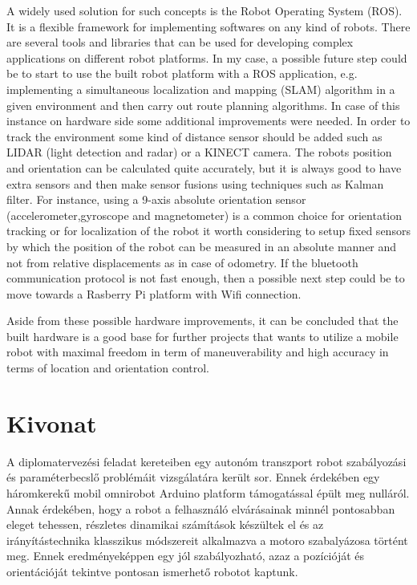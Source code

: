 \documentclass[12pt,english,twoside]{article}
\begin{document}
A widely used solution for such concepts is the Robot Operating System (ROS). It is a flexible framework for implementing softwares on any kind of robots. There are several tools and libraries that can be used for developing complex applications on different robot platforms. In my case, a possible future step could be to start to use the built robot platform with a ROS application, e.g. implementing a simultaneous localization and mapping (SLAM) algorithm in a given environment and then carry out route planning algorithms. In case of this instance on hardware side some additional improvements were needed. In order to track the environment some kind of distance sensor should be added such as LIDAR (light detection and radar) or a KINECT camera. The robots position and orientation can be calculated quite accurately, but it is always good to have extra sensors and then make sensor fusions using techniques such as Kalman filter. For instance, using a 9-axis absolute orientation sensor (accelerometer,gyroscope and magnetometer) is a common choice for orientation tracking or for localization of the robot it worth considering to setup fixed sensors by which the position of the robot can be measured in an absolute manner and not from relative displacements as in case of odometry. If the bluetooth communication protocol is not fast enough, then a possible next step could be to move towards a Rasberry Pi platform with Wifi connection. 

Aside from these possible hardware improvements, it can be concluded that the built hardware is a good base for further projects that wants to utilize a mobile robot with maximal freedom in term of maneuverability and high accuracy in terms of location and orientation control.

\newpage
\section*{Kivonat}
A diplomatervezési feladat kereteiben egy autonóm transzport robot szabályozási és paraméterbecslő problémáit vizsgálatára került sor. Ennek érdekében egy háromkerekű mobil omnirobot Arduino platform támogatással épült meg nulláról. Annak érdekében, hogy a robot a felhasználó elvárásainak minnél pontosabban eleget tehessen, részletes dinamikai számítások készültek el és az irányítástechnika klasszikus módszereit alkalmazva a motoro szabalyázosa történt meg. Ennek eredményeképpen egy jól szabályozható, azaz a pozícióját és orientációját tekintve pontosan ismerhető robotot kaptunk. 
\end{document}
